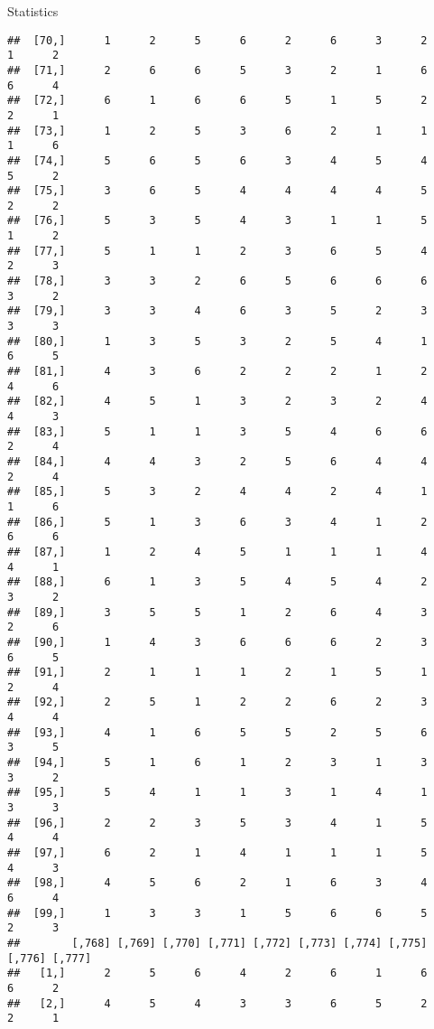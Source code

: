\documentclass[
  ignorenonframetext,
]{beamer}
\begin{document}
\begin{frame}[fragile]{Statistics}
\begin{verbatim}
##  [70,]      1      2      5      6      2      6      3      2      1      2
##  [71,]      2      6      6      5      3      2      1      6      6      4
##  [72,]      6      1      6      6      5      1      5      2      2      1
##  [73,]      1      2      5      3      6      2      1      1      1      6
##  [74,]      5      6      5      6      3      4      5      4      5      2
##  [75,]      3      6      5      4      4      4      4      5      2      2
##  [76,]      5      3      5      4      3      1      1      5      1      2
##  [77,]      5      1      1      2      3      6      5      4      2      3
##  [78,]      3      3      2      6      5      6      6      6      3      2
##  [79,]      3      3      4      6      3      5      2      3      3      3
##  [80,]      1      3      5      3      2      5      4      1      6      5
##  [81,]      4      3      6      2      2      2      1      2      4      6
##  [82,]      4      5      1      3      2      3      2      4      4      3
##  [83,]      5      1      1      3      5      4      6      6      2      4
##  [84,]      4      4      3      2      5      6      4      4      2      4
##  [85,]      5      3      2      4      4      2      4      1      1      6
##  [86,]      5      1      3      6      3      4      1      2      6      6
##  [87,]      1      2      4      5      1      1      1      4      4      1
##  [88,]      6      1      3      5      4      5      4      2      3      2
##  [89,]      3      5      5      1      2      6      4      3      2      6
##  [90,]      1      4      3      6      6      6      2      3      6      5
##  [91,]      2      1      1      1      2      1      5      1      2      4
##  [92,]      2      5      1      2      2      6      2      3      4      4
##  [93,]      4      1      6      5      5      2      5      6      3      5
##  [94,]      5      1      6      1      2      3      1      3      3      2
##  [95,]      5      4      1      1      3      1      4      1      3      3
##  [96,]      2      2      3      5      3      4      1      5      4      4
##  [97,]      6      2      1      4      1      1      1      5      4      3
##  [98,]      4      5      6      2      1      6      3      4      6      4
##  [99,]      1      3      3      1      5      6      6      5      2      3
##        [,768] [,769] [,770] [,771] [,772] [,773] [,774] [,775] [,776] [,777]
##   [1,]      2      5      6      4      2      6      1      6      6      2
##   [2,]      4      5      4      3      3      6      5      2      2      1

\end{verbatim}
\end{frame}
\end{document}
